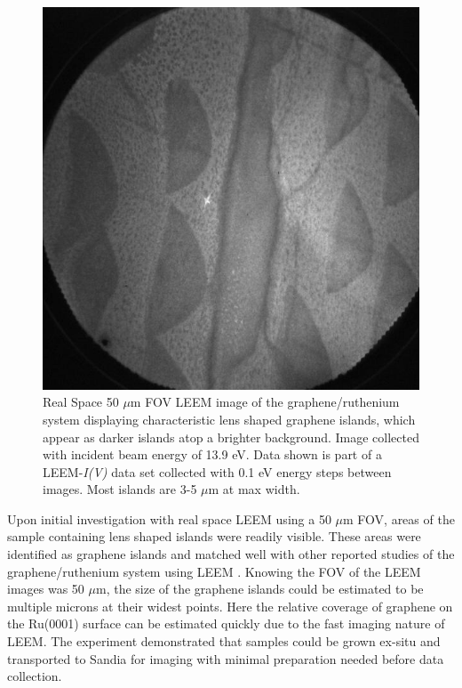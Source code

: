 \begin{figure}
  \centering
  \includegraphics[scale=0.75]{./figs/LEEM-islands.jpg}
  \caption{
  Real Space 50 $\mu$m FOV LEEM image of the graphene/ruthenium system displaying characteristic lens shaped graphene islands, which appear as darker islands atop a brighter background. Image collected with incident beam energy of 13.9 eV. Data shown is part of a LEEM-\textit{I(V)} data set collected with 0.1 eV energy steps between images. Most islands are 3-5 $\mu$m at max width.
  }
  \label{fig:LEEM-islands}
\end{figure}

Upon initial investigation with real space LEEM using a 50 $\mu$m FOV, areas of the sample containing lens shaped islands were readily visible. These areas were identified as graphene islands and matched well with other reported studies of the graphene/ruthenium system using LEEM \cite{sutterleem}. Knowing the FOV of the LEEM images was 50 $\mu$m, the size of the graphene islands could be estimated to be multiple microns at their widest points. Here the relative coverage of graphene on the Ru(0001) surface can be estimated quickly due to the fast imaging nature of LEEM. The experiment demonstrated that samples could be grown ex-situ and transported to Sandia for imaging with minimal preparation needed before data collection.

